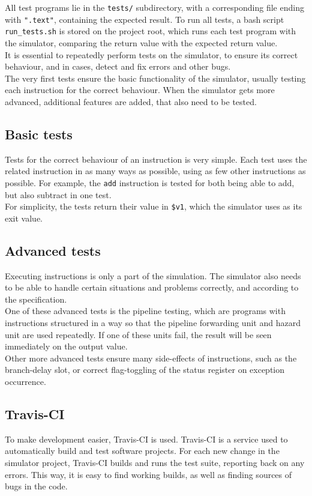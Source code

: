 All test programs lie in the \texttt{tests/} subdirectory, with a corresponding
file ending with \texttt{".text"}, containing the expected result.
To run all tests, a bash script \texttt{run\_tests.sh} is stored on the project
root, which runs each test program with the simulator, comparing the return
value with the expected return value.\\
It is essential to repeatedly perform tests on the simulator, to ensure its
correct behaviour, and in cases, detect and fix errors and other bugs.\\
The very first tests ensure the basic functionality of the simulator, usually
testing each instruction for the correct behaviour. When the simulator gets more
advanced, additional features are added, that also need to be tested.

\subsection{Basic tests}
Tests for the correct behaviour of an instruction is very simple. Each test uses
the related instruction in as many ways as possible, using as few other
instructions as possible. For example, the \texttt{add} instruction is tested
for both being able to add, but also subtract in one test.\\
For simplicity, the tests return their value in \texttt{\$v1}, which the
simulator uses as its exit value.\\


\subsection{Advanced tests}
Executing instructions is only a part of the simulation. The simulator also
needs to be able to handle certain situations and problems correctly, and
according to the specification.\\
One of these advanced tests is the pipeline testing, which are programs
with instructions structured in a way so that the pipeline forwarding unit and
hazard unit are used repeatedly. If one of these units fail, the result will be
seen immediately on the output value.\\
Other more advanced tests ensure many side-effects of instructions, such as the
branch-delay slot, or correct flag-toggling of the status register on exception
occurrence.

\subsection{Travis-CI}
To make development easier, Travis-CI is used. Travis-CI is a service used to
automatically build and test software projects\cite{travisci:readme}. For each
new change in the simulator project, Travis-CI builds and runs the test suite,
reporting back on any errors. This way, it is easy to find working builds, as
well as finding sources of bugs in the code.



